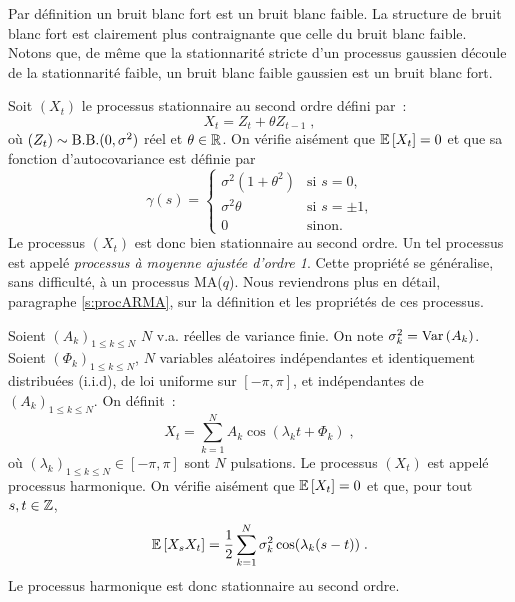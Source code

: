 Par d\'efinition un bruit blanc fort est un bruit blanc faible. La
structure de bruit blanc fort est clairement plus contraignante
que celle du  bruit blanc faible. %
Notons que, de m\^{e}me que la stationnarit\'e stricte  d'un processus
gaussien d\'ecoule de la stationnarit\'e
faible, un bruit blanc faible gaussien est un bruit blanc fort.

\begin{example}[Processus MA(1)]
 \label{exe:MA1covth}
Soit $(X_{t})$ le processus stationnaire au second ordre
d\'efini par~:
\begin{equation}
\label{eq:recurrenceMA1}
 X_{t}= Z_{t} + \theta Z_{t-1} \; ,
\end{equation} o\`u $(Z_{t}) \sim \mathrm{B.B.}(0,\sigma^2)$ r\'eel et $\theta \in
\mathbb{R}$. On v\'erifie ais\'ement que ${\mathbb E}\left[ X_{t} \right]= 0$ et que sa fonction
d'autocovariance est d\'efinie par
\begin{equation}
  \label{eq:ma1-cov}
\gamma(s)=
\begin{cases}
  \sigma^2(1+\theta^2) & \text{si $s=0$,} \\
  \sigma^2 \theta & \text{si $s=\pm 1$,} \\
  0 & \text{sinon.}
\end{cases}
\end{equation}
Le processus $(X_{t})$ est donc bien stationnaire au second ordre.
Un tel processus est appel\'e \emph{processus \`a moyenne ajust\'ee d'ordre 1}.
Cette propri\'et\'e se g\'en\'eralise, sans difficult\'e, \`a un processus
MA($q$). Nous reviendrons plus en d\'etail, paragraphe
\ref{s:procARMA}, sur la d\'efinition et les propri\'et\'es de ces
processus.
\end{example}
\begin{example}
  \label{ex:processusharmonique} Soient $(A_k)_{1 \leq k \leq N}$ $N$
  v.a. r\'eelles de variance finie. On note $\sigma_k^2=\mathrm{Var}\left( A_k \right)$. Soient
  $(\Phi_k)_{1 \leq k \leq N}$, $N$ variables al\'eatoires ind\'ependantes et
  identiquement distribu\'ees (i.i.d), de loi uniforme sur $[-\pi,\pi]$, et
  ind\'ependantes de $(A_k)_{1 \leq k \leq N}$. On d\'efinit~:
\begin{equation}
   X_{t} = \sum_{k=1}^N A_k \cos(\lambda_k t + \Phi_k ) \;,
\end{equation}
o\`u $(\lambda_k)_{1 \leq k \leq N}\in [- \pi,\pi]$ sont $N$ pulsations. Le
processus $(X_{t})$ est appel\'e processus harmonique. On v\'erifie ais\'ement que
${\mathbb E}\left[ X_{t} \right]= 0$ et que, pour tout $s,t\in\mathbb{Z}$,
\[
{\mathbb E}\left[ X_{s}X_{t} \right] = \frac{1}{2}
     \sum_{k=1}^N \sigma_k^2 \cos ( \lambda_k (s-t) ) \;.
\]
Le processus harmonique est donc stationnaire au second ordre.
\end{example}
